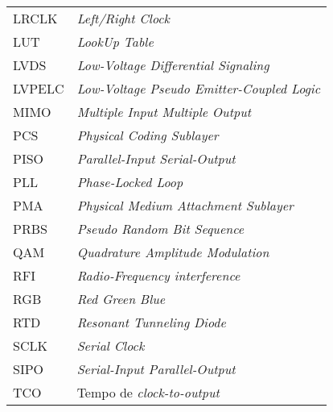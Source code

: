 \begin{flushleft}
\begin{longtable}{l p{0.8\linewidth}}
LRCLK     & \textit{Left/Right Clock  }                                                                                      \\
LUT       & \textit{LookUp Table  }                                                                                          \\
LVDS      & \textit{Low-Voltage Differential Signaling }                                                                     \\
LVPELC    & \textit{Low-Voltage Pseudo Emitter-Coupled Logic}                                                                \\
MIMO      & \textit{Multiple Input Multiple Output}                                                               \\
PCS       & \textit{Physical Coding Sublayer}                                                                     \\
PISO      & \textit{Parallel-Input Serial-Output}                                                                 \\
PLL       & \textit{Phase-Locked Loop}                                                                            \\
PMA       & \textit{Physical Medium Attachment Sublayer}                                                          \\
PRBS      & \textit{Pseudo Random Bit Sequence}                                                                   \\
QAM       & \textit{Quadrature Amplitude Modulation}                                                              \\
RFI       & \textit{Radio-Frequency interference  }                                                                          \\
RGB       & \textit{Red Green Blue}                                                                               \\
RTD       & \textit{Resonant Tunneling Diode}                                                                     \\
SCLK      & \textit{Serial Clock}                                                                                            \\
SIPO      & \textit{Serial-Input Parallel-Output}                                                                 \\
T{\tiny CO}       & Tempo de \textit{clock-to-output  }                                                                              \\

\end{longtable}
\end{flushleft}
